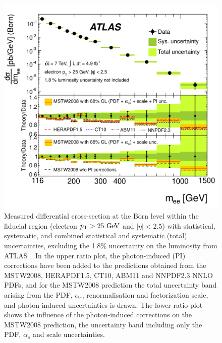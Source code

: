 \begin{figure}[p]
    \centering
    \includegraphics[height=0.3\textheight]{figures/ss-inclboson-drellyan-atlas7tev}
    \caption{Measured differential cross-section at the Born level within the
    fiducial region (electron $\pt > 25 \GeV$ and $|\eta| < 2.5$) with statistical,
     systematic, and combined statistical and systematic (total) uncertainties,
     excluding the 1.8\% uncertainty on the luminosity from ATLAS~\cite{Aad:2013iua}.
     In the upper ratio plot, the photon-induced (PI)
     corrections have been added to the predictions obtained from the MSTW2008,
     HERAPDF1.5, CT10, ABM11 and NNPDF2.3 NNLO PDFs, and for the MSTW2008 prediction
     the total uncertainty band arising from the PDF, $\alpha_s$, renormalisation
     and factorization scale, and photon-induced uncertainties is drawn. The lower
     ratio plot shows the influence of the photon-induced corrections on the
     MSTW2008 prediction, the uncertainty band including only the PDF, $\alpha_s$
     and scale uncertainties.}
    \label{fig:ss-inclboson-drellyan-atlas7tev}
\end{figure}

